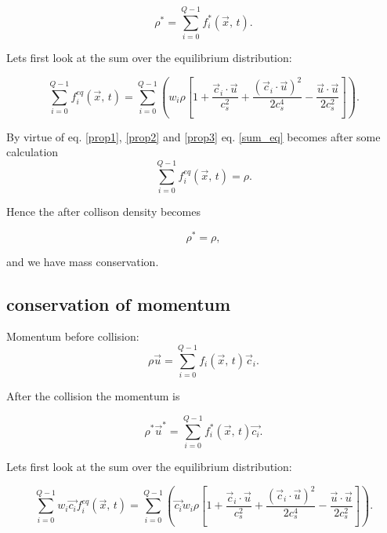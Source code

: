 \begin{equation}
    \rho^* = \sum_{i=0}^{Q-1} f_i^*(\vec{x}, \, t).
\end{equation}


Lets first look at the sum over the equilibrium distribution:

\begin{equation}
    \sum_{i=0}^{Q-1} f_i^{eq}(\vec{x}, \, t) =  \sum_{i=0}^{Q-1} \left( 
     w_i\rho \left[ 1 + 
    \frac{ \vec{c}_i \cdot \vec{u} }{c_s^2} + 
    \frac{(\vec{c}_i \cdot \vec{u})^2}{2c_s^4} -
    \frac{\vec{u}\cdot\vec{u}}{2c_s^2}
    \right]
    \right).
\label{sum_eq}
\end{equation}

By virtue of eq. \ref{prop1}, \ref{prop2} and \ref{prop3} eq. \ref{sum_eq} becomes after some calculation
\begin{equation}
    \sum_{i=0}^{Q-1} f_i^{eq}(\vec{x}, \, t) =  \rho.
\end{equation}

Hence the after collison density becomes

\begin{equation}
    \rho^* = \rho,
\end{equation}

and we have mass conservation.

\subsection{conservation of momentum}

Momentum before collision:
\begin{equation}
\rho\vec{u} = \sum_{i=0}^{Q-1} f_i(\vec{x}, \, t)\vec{c}_i .
\end{equation}

After the collision the momentum is

\begin{equation}
    \rho^*\vec{u}^* = \sum_{i=0}^{Q-1} f_i^*(\vec{x}, \, t)\vec{c_i}.
\end{equation}


Lets first look at the sum over the equilibrium distribution:

\begin{equation}
    \sum_{i=0}^{Q-1} w_i\vec{c_i}f_i^{eq}(\vec{x}, \, t) =  \sum_{i=0}^{Q-1} \left( 
     \vec{c_i}w_i\rho \left[ 1 + 
    \frac{ \vec{c}_i \cdot \vec{u} }{c_s^2} + 
    \frac{(\vec{c}_i \cdot \vec{u})^2}{2c_s^4} -
    \frac{\vec{u}\cdot\vec{u}}{2c_s^2}
    \right]
    \right).
\label{sum_eq_mom}
\end{equation}

